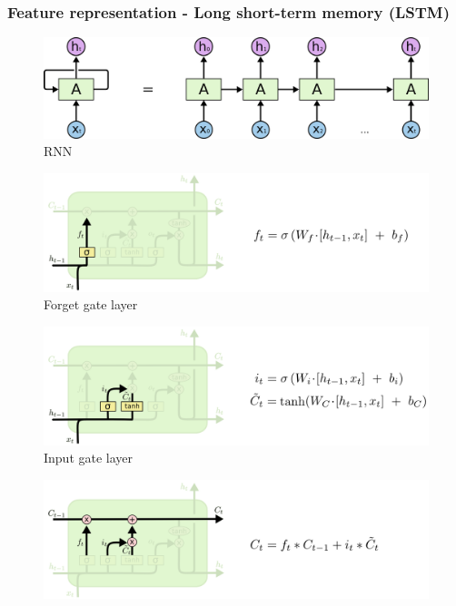 \begin{frame}[allowframebreaks]
    \frametitle{Feature representation - Long short-term memory (LSTM)}
    \begin{figure}[htp]
        \centering
        \includegraphics[width=\textwidth]{topics/201010-zhang2019comprehensive/assets/img/RNN-unrolled.png}
        \caption{RNN}
    \end{figure}
    \begin{figure}[htp]
        \centering
        \includegraphics[width=\textwidth]{topics/201010-zhang2019comprehensive/assets/img/LSTM-1.png}
        \caption{Forget gate layer}
    \end{figure}
    \begin{figure}[htp]
        \centering
        \includegraphics[width=\textwidth]{topics/201010-zhang2019comprehensive/assets/img/LSTM-2.png}
        \caption{Input gate layer}
    \end{figure}
    \begin{figure}[htp]
        \centering
        \includegraphics[width=\textwidth]{topics/201010-zhang2019comprehensive/assets/img/LSTM-3.png}

\end{figure}
\end{frame}
